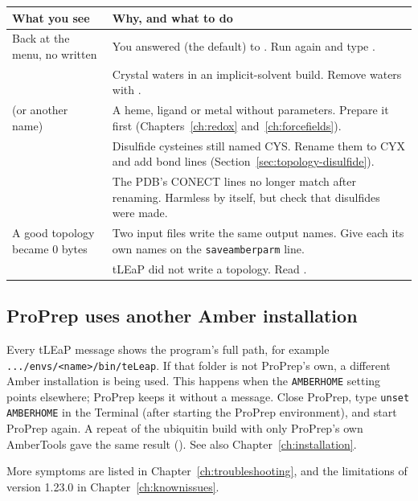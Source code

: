 \begin{tabularx}{\linewidth}{@{}lL@{}}
\toprule
\textbf{What you see} & \textbf{Why, and what to do} \\
\midrule
Back at the menu, no  written &
  You answered  (the default) to . Run  again and type . \\
 &
  Crystal waters in an implicit-solvent build. Remove waters with . \\
 (or another name) &
  A heme, ligand or metal without parameters. Prepare it first
  (Chapters~\ref{ch:redox} and~\ref{ch:forcefields}). \\
 &
  Disulfide cysteines still named CYS. Rename them to CYX and add bond lines
  (Section~\ref{sec:topology-disulfide}). \\
 &
  The PDB's CONECT lines no longer match after renaming. Harmless by itself,
  but check that disulfides were made. \\
A good topology became 0 bytes &
  Two input files write the same output names. Give each its own names on the
  \texttt{saveamberparm} line. \\
 &
  tLEaP did not write a topology. Read . \\
\bottomrule
\end{tabularx}

\subsection{ProPrep uses another Amber installation}

Every tLEaP message shows the program's full path, for example\\
\texttt{.../envs/<name>/bin/teLeap}. If that folder is not ProPrep's own, a
different Amber installation is being used. This happens when the
\texttt{AMBERHOME} setting points elsewhere; ProPrep keeps it without a
message. Close ProPrep, type \texttt{unset AMBERHOME} in the Terminal (after
starting the ProPrep environment), and start ProPrep again. A repeat of the
ubiquitin build with only ProPrep's own AmberTools gave the same result
(). See also Chapter~\ref{ch:installation}.

More symptoms are listed in Chapter~\ref{ch:troubleshooting}, and the
limitations of version 1.23.0 in Chapter~\ref{ch:knownissues}.
